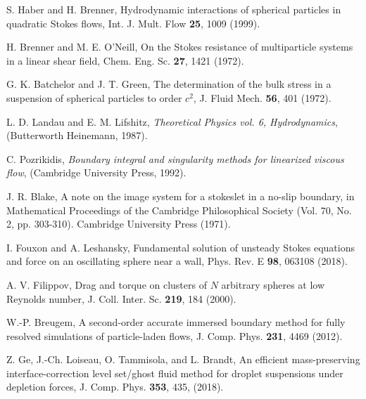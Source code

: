 \begin{thebibliography}{99}
 S. Haber and  H. Brenner, Hydrodynamic interactions of spherical particles in quadratic Stokes flows, Int. J. Mult. Flow \textbf{25}, 1009 (1999).

 H. Brenner and M. E. O'Neill, On the Stokes resistance of multiparticle systems in a linear shear field, Chem. Eng. Sc. \textbf{27}, 1421 (1972).

 G. K. Batchelor and J. T. Green, The determination of the bulk stress in a suspension of spherical particles to order $c^2$, J. Fluid Mech. \textbf{56}, 401 (1972).

 L. D. Landau and E. M. Lifshitz, {\it Theoretical Physics vol. 6, Hydrodynamics}, (Butterworth Heinemann, 1987).

 C. Pozrikidis, {\it Boundary integral and singularity methods for linearized viscous flow}, (Cambridge University Press, 1992).

 J. R. Blake, A note on the image system for a stokeslet in a no-slip boundary, in Mathematical Proceedings of the Cambridge Philosophical Society (Vol. 70, No. 2, pp. 303-310). Cambridge University Press (1971).

 I. Fouxon and A. Leshansky, Fundamental solution of unsteady Stokes equations and force on an oscillating sphere near a wall, Phys. Rev. E \textbf{98}, 063108 (2018).

 A. V. Filippov, Drag and torque on clusters of $N$ arbitrary spheres at low Reynolds number, J. Coll. Inter. Sc. \textbf{219}, 184 (2000).

  W.-P. Breugem, A second-order accurate immersed boundary method for fully resolved simulations of particle-laden flows, J. Comp. Phys. \textbf{231}, 4469 (2012).

  Z. Ge, J.-Ch. Loiseau, O. Tammisola, and L. Brandt, An efficient mass-preserving interface-correction level set/ghost fluid method for droplet suspensions under depletion forces, J. Comp. Phys. \textbf{353}, 435, (2018).



\end{thebibliography}
